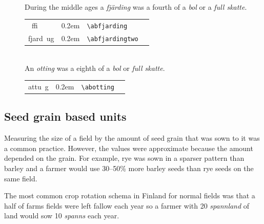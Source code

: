 \documentclass[a4paper]{article}
\newcommand{\samplefont}{\fontsize{16}{16}\abcursivefamily\spaceskip0.2em}
\newcommand{\sample}[1]{{\samplefont #1 \strut}}
\newcommand{\ltxncmd}[1]{\texttt{\textbackslash{}#1}}
\begin{document}
\begin{description}
\item [\sample{\abfjarding}, \sample{\abfjardingtwo}, \emph{fjärding}] \mbox{} \\
  During the middle ages a \emph{fjärding} was a fourth of a
  \emph{bol} or a \emph{full skatte}.
  \begin{center}
    \begin{tabular}{llll}
      {}~ffi  & \sample{\abfjarding} & \ltxncmd{abfjarding} \\
      {}fjard~ug & \sample{\abfjardingtwo} & \ltxncmd{abfjardingtwo}    \\
    \end{tabular}
  \end{center}

\item [\sample{\abotting}, \emph{otting}] \mbox{} \\
  An \emph{otting} was a eighth of a \emph{bol} or \emph{full skatte}.
  \begin{center}
    \begin{tabular}{llll}
      {}attu~g & \sample{\abotting} & \ltxncmd{abotting} \\
    \end{tabular}
  \end{center}
  

\end{description}



\subsection{Seed grain based units}

Measuring the size of a field by the amount of seed grain that was
sown to it was a common practice. However, the values were approximate
because the amount depended on the grain. For example, rye was sown in
a sparser pattern than barley and a farmer would use 30–50\% more
barley seeds than rye seeds on the same field. 

The most common crop rotation schema in Finland for normal fields was
that a half of farms fields were left fallow each year so a farmer
with 20 \emph{spannland} of land would sow 10 \emph{spanns} each year.
\end{document}
